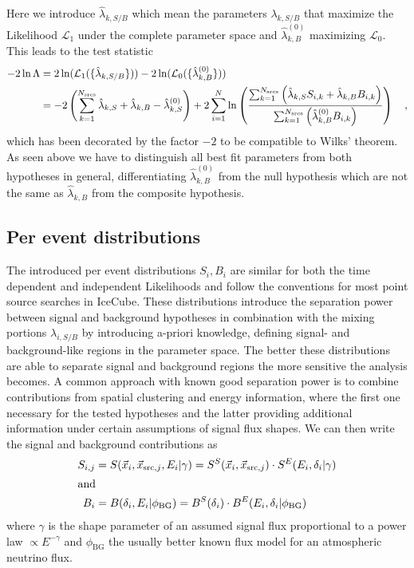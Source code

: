 Here we introduce $\hat{\lambda}_{k,S/B}$ which mean the parameters $\lambda_{k,S/B}$ that maximize the Likelihood $\mathcal{L}_1$ under the complete parameter space and $\hat{\lambda}_{k,B}^{(0)}$ maximizing $\mathcal{L}_0$.
This leads to the test statistic
\begin{equation}
  \begin{aligned}
    -2\ln\Lambda
    &= 2\ln(\mathcal{L}_1(\{\hat{\lambda}_{k,S/B}\})) -
       2\ln(\mathcal{L}_0(\{\hat{\lambda}^{(0)}_{k,B}\})) \\
    &= -2\left(\sum_{k=1}^{N_\text{srcs}}\hat{\lambda}_{k,S} +
                                         \hat{\lambda}_{k,B} -
                                         \hat{\lambda}_{k,S}^{(0)}\right) +
      2\sum_{i=1}^N \ln\left(
        \frac{\sum_{k=1}^{N_\text{srcs}}\left(
            \hat{\lambda}_{k,S} S_{i,k}+\hat{\lambda}_{k,B} B_{i,k}\right)}
            {\sum_{k=1}^{N_\text{srcs}}\left(
              \hat{\lambda}_{k,B}^{(0)} B_{i,k}
            \right)}
          \right)
    \quad\text{,}
  \end{aligned}
\end{equation}
which has been decorated by the factor $-2$ to be compatible to Wilks' theorem.
As seen above we have to distinguish all best fit parameters from both hypotheses in general, differentiating $\hat{\lambda}_{k,B}^{(0)}$ from the null hypothesis which are not the same as $\hat{\lambda}_{k,B}$ from the composite hypothesis.

\subsection{Per event distributions}
The introduced per event distributions $S_i, B_i$ are similar for both the time dependent and independent Likelihoods and follow the conventions for most point source searches in IceCube.
These distributions introduce the separation power between signal and background hypotheses in combination with the mixing portions $\lambda_{i,S/B}$ by introducing a-priori knowledge, defining signal- and background-like regions in the parameter space.
The better these distributions are able to separate signal and background regions the more sensitive the analysis becomes.
A common approach with known good separation power is to combine contributions from spatial clustering and energy information, where the first one necessary for the tested hypotheses and the latter providing additional information under certain assumptions of signal flux shapes.
We can then write the signal and background contributions as
\begin{align}
  S_{i,j} &= S(\vec{x}_i, \vec{x}_{\mathrm{src},j}, E_i | \gamma)
    = S^S(\vec{x}_i, \vec{x}_{\mathrm{src},j})\cdot
      S^E(E_i, \delta_i | \gamma) \\
  \intertext{and}
  B_i &= B(\delta_i, E_i | \phi_\mathrm{BG})
    = B^S(\delta_i) \cdot B^E(E_i, \delta_i | \phi_\mathrm{BG})
\end{align}
where $\gamma$ is the shape parameter of an assumed signal flux proportional to a power law $\propto E^{-\gamma}$ and $\phi_\mathrm{BG}$ the usually better known flux model for an atmospheric neutrino flux.

